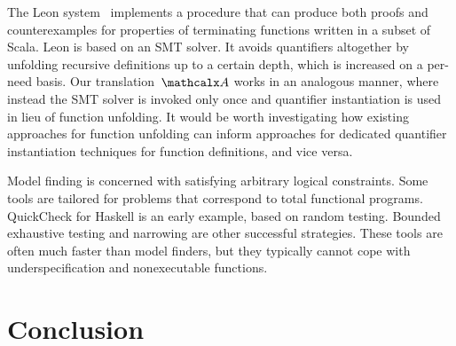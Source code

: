 The Leon system~\cite{blanc2013overview} implements a procedure that can
produce both proofs and counter\-examples for properties of terminating functions
written in a subset of Scala. Leon is based on an SMT solver. It avoids
quantifiers altogether by unfolding recursive definitions up to a certain
depth, which is increased on a per-need basis.
Our translation~$\conv$ works in an analogous manner,
where instead the SMT solver is invoked only once
and quantifier instantiation is used in lieu of function unfolding.
It would be
worth investigating how existing approaches for function
unfolding can inform approaches for dedicated quantifier instantiation
techniques for function definitions, and vice versa.

Model finding is concerned with satisfying arbitrary logical constraints. Some
tools are tailored for problems that correspond to total functional
programs. QuickCheck \cite{claessen-hughes-2000} for Haskell is an
early example, based on random testing. Bounded exhaustive testing
\cite{runciman-et-al-2008} and narrowing
\cite{lindblad-2008-testing} are other successful strategies. These
tools are often much faster than model finders, but they typically cannot cope
with underspecification and nonexecutable functions.




%
%
%

\section{Conclusion}
\label{sec:conclusion}

